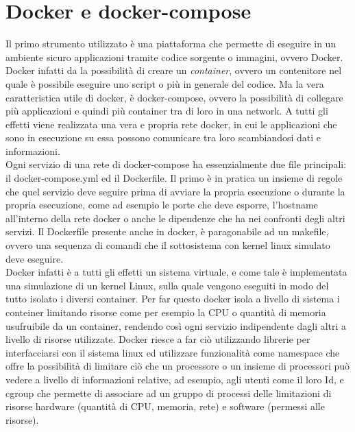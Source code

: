 \documentclass[a4paper,titlepage,12pt]{book}
\begin{document}
\sffamily
\section{\sffamily
Docker e docker-compose}
Il primo strumento utilizzato è una piattaforma che permette di eseguire in un ambiente sicuro applicazioni tramite codice sorgente o immagini, ovvero Docker. Docker infatti da la possibilità di creare un \textit{container}, ovvero un contenitore nel quale è possibile eseguire uno script o più in generale del codice. Ma la vera caratteristica utile di docker, è docker-compose, ovvero la possibilità di collegare più applicazioni e quindi più container tra di loro in una network. A tutti gli effetti viene realizzata una vera e propria rete docker, in cui le applicazioni che sono in esecuzione su essa possono comunicare tra loro scambiandosi dati e informazioni.\\
Ogni servizio di una rete di docker-compose ha essenzialmente due file principali: il docker-compose.yml ed il Dockerfile. Il primo è in pratica un insieme di regole che quel servizio deve seguire prima di avviare la propria esecuzione o durante la propria esecuzione, come ad esempio le porte che deve esporre, l'hostname all'interno della rete docker o anche le dipendenze che ha nei confronti degli altri servizi. Il Dockerfile presente anche in docker, è paragonabile ad un makefile, ovvero una sequenza di comandi che il sottosistema con kernel linux simulato deve eseguire.\\
Docker infatti è a tutti gli effetti un sistema virtuale, e come tale è implementata una simulazione di un kernel Linux, sulla quale vengono eseguiti in modo del tutto isolato i diversi container.
Per far questo docker isola a livello di sistema i conteiner limitando risorse come per esempio la CPU o quantità di memoria usufruibile da un container, rendendo così ogni servizio indipendente dagli altri a livello di risorse utilizzate. Docker riesce a far ciò utilizzando librerie per interfacciarsi con il sistema linux ed utilizzare funzionalità come namespace che offre la possibilità di limitare ciò che un processore o un insieme di processori può vedere a livello di informazioni relative, ad esempio, agli utenti come il loro Id, e cgroup che permette di associare ad un gruppo di processi delle limitazioni di risorse hardware (quantità di CPU, memoria, rete) e software (permessi alle risorse).

\sffamily
\end{document}
